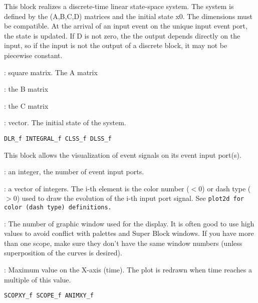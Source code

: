 %
%


\label{DLSSf}

This block realizes a discrete-time linear state-space system.
The system is defined by the (A,B,C,D) matrices and the initial
state x0. The dimensions must be compatible. At the arrival of
an input event on the unique input event port, the state is
updated. If D is not zero, the
the output depends directly on the input, so if the input 
is not the output of a discrete block, it may not be piecewise constant.
\begin{scitem}
\item[{\verb?A?}]
: square matrix. The A matrix
\item[{\verb?B?}]
: the B matrix
\item[{\verb?C?}]
: the C matrix
\item[{\verb?x0?}]
: vector. The initial state of the system.
\end{scitem}%
{\verb?DLR_f INTEGRAL_f CLSS_f DLSS_f?} \pageref{DLRfINTEGRALfCLSSfDLSSf}





%
%


\label{EVENTFSCOPEf}

This block allows the visualization of event signals
on its event input port(s).
\begin{scitem}
\item[{\verb?Number of inputs?}]
: an integer, the number of event input ports.
\item[{\verb?Curve colors?}]
: a vector of integers. The i-th element is the color number ($<$0)
or dash type ($>$0) used to draw the evolution of the i-th 
input port signal. See %
\tt plot2d %
\rm for color (dash type) definitions.
\item[{\verb?Output window number?}]
: The number of graphic window used for the display. It is often good
to use high values to avoid conflict with palettes and Super Block
windows. If you have more than one scope, make sure they don't have
the same window numbers (unless superposition of the curves is desired).
\item[{\verb?Refresh period?}]
: Maximum value on the X-axis (time). The plot is redrawn when time
reaches a multiple of this value.
\end{scitem}%
{\verb?SCOPXY_f SCOPE_f ANIMXY_f?} \pageref{SCOPXYfSCOPEfANIMXYf}




